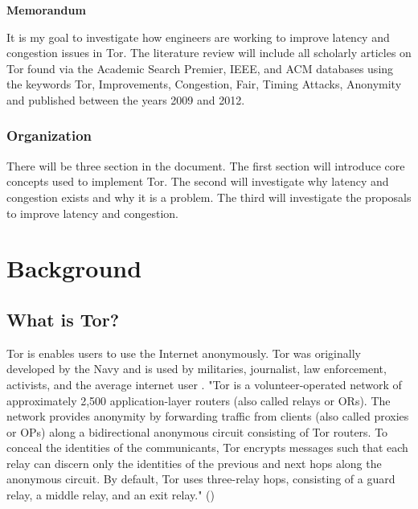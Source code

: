 \documentclass[letterpaper,13pt]{texMemo}
\begin{document}
\singlespace
\begin{center}
\large {\bf Memorandum}
\end{center}
\setlength{\topmargin}{0in}
\maketitle

It is my goal to investigate how engineers are working to improve latency and congestion issues in
Tor. The literature review will include all scholarly articles on Tor found via the Academic Search
Premier, IEEE, and ACM databases using the keywords Tor, Improvements, Congestion, Fair, Timing
Attacks, Anonymity and published between the years 2009 and 2012.

\subsubsection*{Organization}
There will be three section in the document. The first section will introduce core concepts used to
implement Tor. The second will investigate why latency and congestion exists and why it is a
problem. The third will investigate the proposals to improve latency and congestion.

\section*{Background}

    \subsection*{What is Tor?}
    Tor is enables users to use the Internet anonymously. Tor was originally developed by the Navy
    and is used by militaries, journalist, law enforcement, activists, and the average internet user
    \citep[2]{Tor:web}. 
    "Tor is a volunteer-operated network of approximately 2,500 application-layer routers (also
    called relays or ORs). The network provides anonymity by forwarding traffic from clients (also
    called proxies or OPs) along a bidirectional anonymous circuit consisting of Tor routers. To
    conceal the identities of the communicants, Tor encrypts messages such that each relay can
    discern only the identities of the previous and next hops along the anonymous circuit.  By
    default, Tor uses three-relay hops, consisting of a guard relay, a middle relay, and an exit
    relay." (\citeauthor[1]{Moore})
\end{document}
